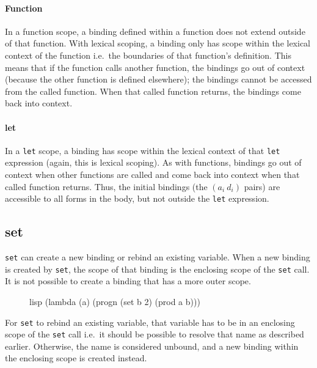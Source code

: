 \paragraph{Function}
In a function scope, a binding defined within a function does not extend outside of that function. With lexical scoping, a binding only has scope within the lexical context of the function i.e.\ the boundaries of that function's definition. This means that if the function calls another function, the bindings go out of context (because the other function is defined elsewhere); the bindings cannot be accessed from the called function. When that called function returns, the bindings come back into context.

\paragraph{let}
In a \texttt{let} scope, a binding has scope within the lexical context of that \texttt{let} expression (again, this is lexical scoping). As with functions, bindings go out of context when other functions are called and come back into context when that called function returns. Thus, the initial bindings (the $(a_i\ d_i)$ pairs) are accessible to all forms in the body, but not outside the \texttt{let} expression.

\subsection{set}
\texttt{set} can create a new binding or rebind an existing variable. When a new binding is created by \texttt{set}, the scope of that binding is the enclosing scope of the \texttt{set} call. It is not possible to create a binding that has a more outer scope.

\begin{figure}[htp]
    \centering
    \begin{cminted}[autogobble=true, escapeinside=??]{lisp}
        (lambda (a) (progn (set b 2) (prod a b)))
    \end{cminted}
    \captionsetup[figure]{font=small}
\end{figure}

For \texttt{set} to rebind an existing variable, that variable has to be in an enclosing scope of the \texttt{set} call i.e.\ it should be possible to resolve that name as described earlier. Otherwise, the name is considered unbound, and a new binding within the enclosing scope is created instead.

